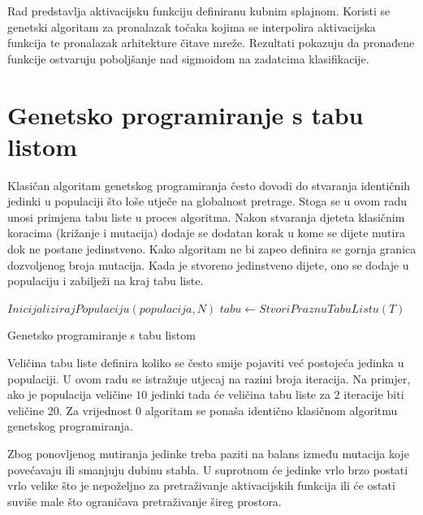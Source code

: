 \documentclass[times, utf8, numeric, diplomski]{fer}
\begin{document}
Rad \citet{cube_spline_func} predstavlja aktivacijsku funkciju definiranu kubnim splajnom. Koristi se genetski algoritam za pronalazak točaka kojima se interpolira aktivacijska funkcija te pronalazak arhitekture čitave mreže. Rezultati pokazuju da pronađene funkcije ostvaruju poboljšanje nad sigmoidom na zadatcima klasifikacije.

\section{Genetsko programiranje s tabu listom}
Klasičan algoritam genetskog programiranja često dovodi do stvaranja identičnih jedinki u populaciji što loše utječe na globalnost pretrage. Stoga se u ovom radu unosi primjena tabu liste u proces algoritma. Nakon stvaranja djeteta klasičnim koracima (križanje i mutacija) dodaje se dodatan korak u kome se dijete mutira dok ne postane jedinstveno. Kako algoritam ne bi zapeo definira se gornja granica dozvoljenog broja mutacija. Kada je stvoreno jedinstveno dijete, ono se dodaje u populaciju i zabilježi na kraj tabu liste.
\newline
\newline
\begin{algorithm}[H]
\DontPrintSemicolon
{}
$InicijalizirajPopulaciju(populacija, N)$ \;
$tabu \gets StvoriPraznuTabuListu(T)$ \;
\;
\caption{Genetsko programiranje s tabu listom}
\label{alg:gp_taboo}
\end{algorithm}

Veličina tabu liste definira koliko se često smije pojaviti već postojeća jedinka u populaciji. U ovom radu se istražuje utjecaj na razini broja iteracija. Na primjer, ako je populacija veličine $10$ jedinki tada će veličina tabu liste za $2$ iteracije biti veličine $20$. Za vrijednost $0$ algoritam se ponaša identično klasičnom algoritmu genetskog programiranja.

Zbog ponovljenog mutiranja jedinke treba paziti na balans između mutacija koje povećavaju ili smanjuju dubinu stabla. U suprotnom će jedinke vrlo brzo postati vrlo velike što je nepoželjno za pretraživanje aktivacijskih funkcija \citep{swish} ili će ostati suviše male što ograničava pretraživanje šireg prostora.
\end{document}
